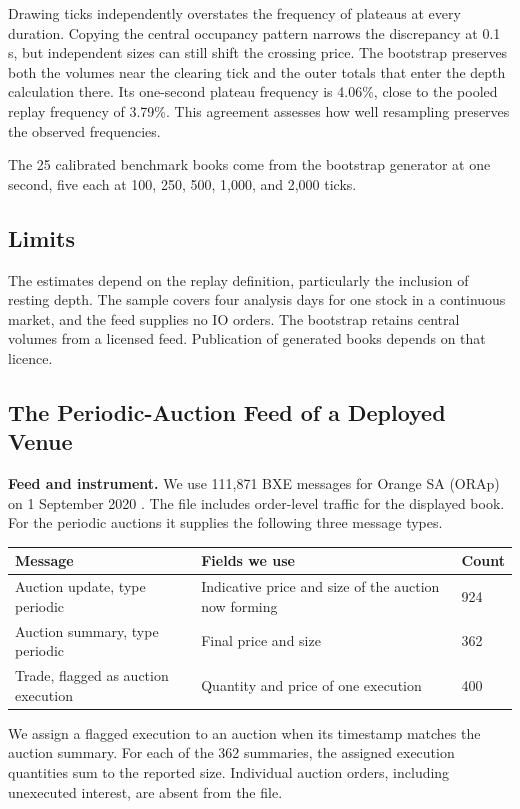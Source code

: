 Drawing ticks independently overstates the frequency of plateaus at every duration. Copying the central occupancy pattern narrows the discrepancy at 0.1 s, but independent sizes can still shift the crossing price. The bootstrap preserves both the volumes near the clearing tick and the outer totals that enter the depth calculation there. Its one-second plateau frequency is 4.06\%, close to the pooled replay frequency of 3.79\%. This agreement assesses how well resampling preserves the observed frequencies.

The 25 calibrated benchmark books come from the bootstrap generator at one second, five each at 100, 250, 500, 1,000, and 2,000 ticks.

\subsection{Limits}

The estimates depend on the replay definition, particularly the inclusion of resting depth. The sample covers four analysis days for one stock in a continuous market, and the feed supplies no IO orders. The bootstrap retains central volumes from a licensed feed. Publication of generated books depends on that licence.

\subsection{The Periodic-Auction Feed of a Deployed Venue}

\textbf{Feed and instrument.} We use 111,871 BXE messages for Orange SA (ORAp) on 1 September 2020 \cite{cboepitch}. The file includes order-level traffic for the displayed book. For the periodic auctions it supplies the following three message types.

\begin{longtable}[]{@{}lll@{}}
\toprule\noalign{}
Message & Fields we use & Count \\
\midrule\noalign{}
\endhead
\bottomrule\noalign{}
\endlastfoot
Auction update, type periodic & Indicative price and size of the auction now forming & 924 \\
Auction summary, type periodic & Final price and size & 362 \\
Trade, flagged as auction execution & Quantity and price of one execution & 400 \\
\end{longtable}

We assign a flagged execution to an auction when its timestamp matches the auction summary. For each of the 362 summaries, the assigned execution quantities sum to the reported size. Individual auction orders, including unexecuted interest, are absent from the file.

